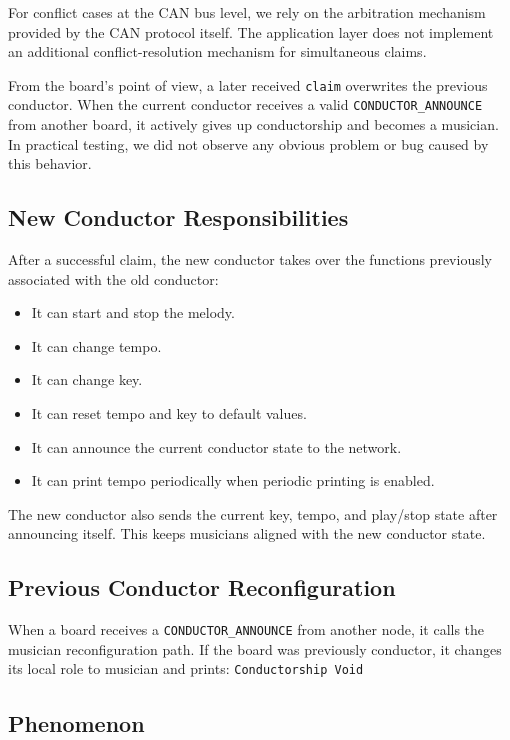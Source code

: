 \documentclass[11pt,a4paper]{article}
\begin{document}
For conflict cases at the CAN bus level, we rely on the arbitration mechanism provided by the CAN protocol itself. The application layer does not implement an additional conflict-resolution mechanism for simultaneous claims.

From the board's point of view, a later received \texttt{claim} overwrites the previous conductor. When the current conductor receives a valid \texttt{CONDUCTOR\_\allowbreak{}ANNOUNCE} from another board, it actively gives up conductorship and becomes a musician. In practical testing, we did not observe any obvious problem or bug caused by this behavior.

\subsection*{New Conductor Responsibilities}

After a successful claim, the new conductor takes over the functions previously associated with the old conductor:

\begin{itemize}
  \item It can start and stop the melody.
  \item It can change tempo.
  \item It can change key.
  \item It can reset tempo and key to default values.
  \item It can announce the current conductor state to the network.
  \item It can print tempo periodically when periodic printing is enabled.
\end{itemize}

The new conductor also sends the current key, tempo, and play/stop state after announcing itself. This keeps musicians aligned with the new conductor state.

\subsection*{Previous Conductor Reconfiguration}

When a board receives a \texttt{CONDUCTOR\_\allowbreak{}ANNOUNCE} from another node, it calls the musician reconfiguration path. If the board was previously conductor, it changes its local role to musician and prints: \texttt{Conductorship Void}

\subsection*{Phenomenon}
\end{document}
